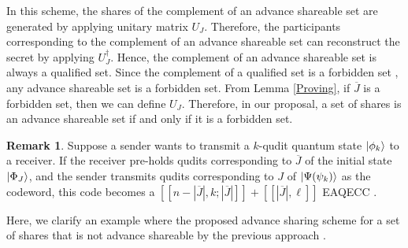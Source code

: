 \documentclass[11pt,a4paper]{article}
\theoremstyle{definition}
\newtheorem{remark}{\textbf{Remark}}
\begin{document}
    In this scheme, the shares of the complement of an advance shareable set are generated by applying unitary matrix $U_J$. 
    Therefore, the participants corresponding to the complement of an advance shareable set can reconstruct the secret by applying $U_J^{\dagger}$.
    Hence, the complement of an advance shareable set is always a qualified set. 
    Since the complement of a qualified set is a forbidden set \cite{rampQSS_Ogawa_2005}, 
    any advance shareable set is a forbidden set. 
    From Lemma \ref{Proving}, if \(\overline{J}\) is a forbidden set, then we can define \(U_J\). 
    Therefore, in our proposal, a set of shares is an advance shareable set if and only if it is a forbidden set.
\begin{remark}
    Suppose a sender wants to transmit a $k$-qudit quantum state $\ket{\phi_k}$ to a receiver.
    If the receiver pre-holds qudits corresponding to \( \overline{J} \) of the initial state $\ket{\Phi_J}$, and the sender transmits qudits corresponding to \( J \) of $\ket{\Psi(\psi_k)}$ as the codeword, this code becomes a $[[n-|\overline{J}|,k;|\overline{J}|]]+[[|\overline{J}|,\ell]]$ EAQECC \cite{EAQECC_from_Stabilizer_Brun_2012}.
\end{remark}
Here, we clarify an example where the proposed advance sharing scheme for a set of shares that is not advance shareable by the previous approach \cite{AdvanceSharing_Shibata}.
\end{document}
